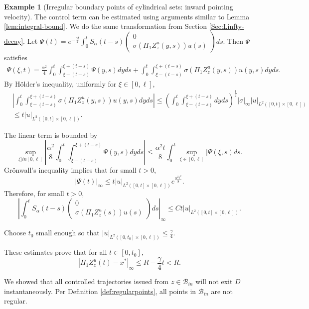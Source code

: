 \documentclass[10pt, reqno]{amsart}
\theoremstyle{definition}
\newtheorem{example}{Example}
\numberwithin{lem}{section}
\numberwithin{cor}{section}
\numberwithin{prop}{section}
\numberwithin{thm}{section}
\numberwithin{dfn}{section}
\begin{document}
\begin{example}[Irregular boundary points of cylindrical sets: inward pointing velocity]
The control term can be estimated using arguments similar to Lemma \ref{lem:integral-bound}. We do the same transformation from Section \ref{Sec:Linfty-decay}. Let $\Psi(t) = e^{-\frac{\alpha t}{2}}\int_0^t S_\alpha(t-s) \begin{pmatrix} 0\\ \sigma(\Pi_1 Z^u_z(y,s))u(s)\end{pmatrix} ds$. Then $\Psi$ satisfies
\begin{align*}
    \Psi(\xi,t) = \frac{\alpha^2}{4}\int_0^t \int_{\xi-(t-s)}^{\xi + (t-s)} \Psi(y,s)dyds + \int_0^t \int_{\xi-(t-s)}^{\xi + (t-s)}\sigma(\Pi_1 Z^u_z(y,s))u(y,s)dyds.
\end{align*}
By H\"older's inequality, uniformly for $\xi \in [0,\ell]$,
\begin{align*}
    &\left|\int_0^t \int_{\xi-(t-s)}^{\xi + (t-s)}\sigma(\Pi_1 Z^u_z(y,s))u(y,s)dyds \right|
    \leq \left(\int_0^t \int_{\xi-(t-s)}^{\xi+(t-s)}dyds \right)^{\frac{1}{2}}|\sigma|_{\infty}|u|_{L^2([0,t]\times[0,\ell])}\nonumber\\
    &\leq t|u|_{L^2([0,t]\times[0,\ell])}.
\end{align*}

The linear term is bounded by
\begin{equation*}
    \sup_{\xi ]in [0,\ell]} \left|\frac{\alpha^2}{8}\int_0^t \int_{\xi-(t-s)}^{\xi + (t-s)} \Psi(y,s)dyds \right| \leq \frac{\alpha^2 t}{8}\int_0^t \sup_{\xi \in [0,\ell]} |\Psi(\xi,s)ds.
\end{equation*}
Gr\"onwall's inequality implies that for small $t>0$,
\begin{equation*}
    |\Psi(t)|_\infty \leq t |u|_{L^2([0,t]\times[0,\ell])}e^{\frac{\alpha^2 t^2}{8}}.
\end{equation*}
Therefore, for small $t>0$,
\begin{equation*}
    \left|\int_0^t S_\alpha(t-s) \begin{pmatrix} 0\\\sigma(\Pi_1 Z^u_z(s))u(s)\end{pmatrix} ds\right|_\infty \leq Ct |u|_{L^2([0,t]\times[0,\ell])}.
\end{equation*}

Choose $t_0$ small enough so that $|u|_{L^2([0,t_0]\times[0,\ell])}\leq \frac{\gamma}{4}$.



These estimates prove that for all $t\in[0,t_0]$,
\begin{equation*}
    |\Pi_1 Z^u_z(t) - x^*|_\infty \leq  R - \frac{\gamma}{4} t <R.
\end{equation*}


We showed that all controlled trajectories issued from $z\in\mathcal{B}_{in}$ will not exit $D$ instantaneously. Per Definition \ref{def:regularpoints}, all points in $\mathcal{B}_{in}$ are not regular.
\end{example}
\end{document}
